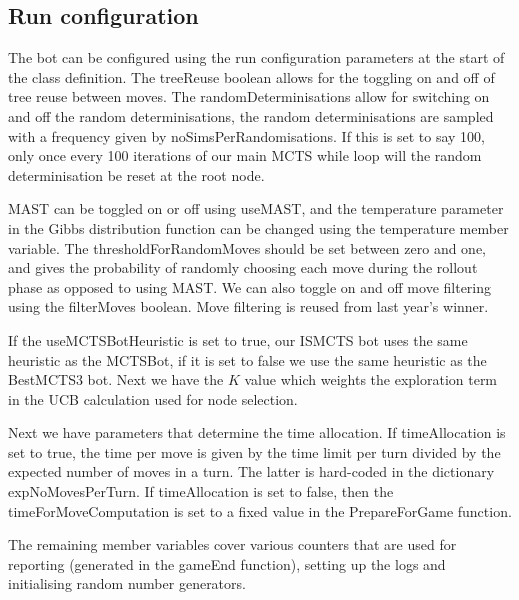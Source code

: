 \documentclass[a4paper,10pt]{article}
\begin{document}
\subsection{Run configuration}
The bot can be configured using the run configuration parameters at the start of the class definition. The treeReuse boolean allows for the toggling on and off of tree reuse between moves. The randomDeterminisations allow for switching on and off the random determinisations, the random determinisations are sampled with a frequency given by noSimsPerRandomisations. If this is set to say 100, only once every 100 iterations of our main MCTS while loop will the random determinisation be reset at the root node.

MAST can be toggled on or off using useMAST, and the temperature parameter in the Gibbs distribution function can be changed using the temperature member variable. The thresholdForRandomMoves should be set between zero and one, and gives the probability of randomly choosing each move during the rollout phase as opposed to using MAST. We can also toggle on and off move filtering using the filterMoves boolean. Move filtering is reused from last year's winner.

If the useMCTSBotHeuristic is set to true, our ISMCTS bot uses the same heuristic as the MCTSBot, if it is set to false we use the same heuristic as the BestMCTS3 bot. Next we have the $K$ value which weights the exploration term in the UCB calculation used for node selection.

Next we have parameters that determine the time allocation. If timeAllocation is set to true, the time per move is given by the time limit per turn divided by the expected number of moves in a turn. The latter is hard-coded in the dictionary expNoMovesPerTurn. If timeAllocation is set to false, then the timeForMoveComputation is set to a fixed value in the PrepareForGame function.

The remaining member variables cover various counters that are used for reporting (generated in the gameEnd function), setting up the logs and initialising random number generators.
\end{document}
